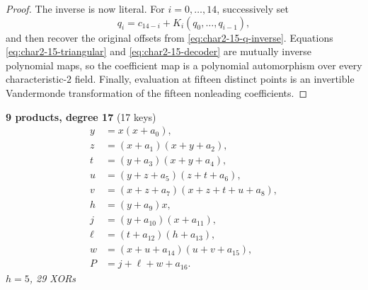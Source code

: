 \begin{proof}
The inverse is now literal.  For $i=0,\ldots,14$, successively set
\[
 q_i=c_{14-i}+K_i(q_0,\ldots,q_{i-1}),                            \tag{A.7}\label{eq:char2-15-decoder}
\]
and then recover the original offsets from
\eqref{eq:char2-15-q-inverse}.  Equations
\eqref{eq:char2-15-triangular} and \eqref{eq:char2-15-decoder} are mutually
inverse polynomial maps, so the
coefficient map is a polynomial automorphism over every characteristic-$2$
field.  Finally, evaluation at fifteen distinct points is an invertible
Vandermonde transformation of the fifteen nonleading coefficients.
\end{proof}

\medskip
\noindent
\begin{minipage}[t]{\textwidth}
\textbf{9 products, degree 17} (17 keys)
\[
\begin{aligned}
y &= x(x+a_0),\\
z &= (x+a_1)(x+y+a_2),\\
t &= (y+a_3)(x+y+a_4),\\
u &= (y+z+a_5)(z+t+a_6),\\
v &= (x+z+a_7)(x+z+t+u+a_8),\\
h &= (y+a_9)x,\\
j &= (y+a_{10})(x+a_{11}),\\
\ell &= (t+a_{12})(h+a_{13}),\\
w &= (x+u+a_{14})(u+v+a_{15}),\\
P &= j+\ell+w+a_{16}.
\end{aligned}
\]
\emph{$h=5$, 29 XORs}
\end{minipage}

